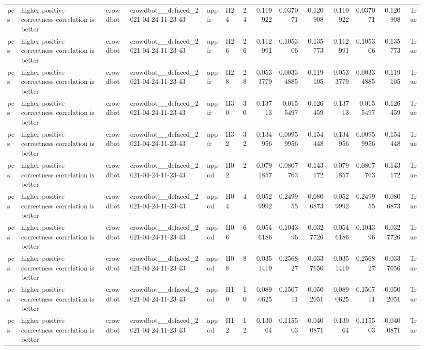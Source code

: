 \begin{longtable}{llllllrrrrrrrr}
pcs & higher positive correctness correlation is better & crowdbot & crowdbot\_\_defaced\_2021-04-24-11-23-43 & appfr & H24 & 24 & 0.119922 & 0.037071 & -0.120908 & 0.119922 & 0.037071 & -0.120908 & True \\
pcs & higher positive correctness correlation is better & crowdbot & crowdbot\_\_defaced\_2021-04-24-11-23-43 & appfr & H26 & 26 & 0.112991 & 0.105306 & -0.135773 & 0.112991 & 0.105306 & -0.135773 & True \\
pcs & higher positive correctness correlation is better & crowdbot & crowdbot\_\_defaced\_2021-04-24-11-23-43 & appfr & H28 & 28 & 0.0533779 & 0.00334885 & -0.119105 & 0.0533779 & 0.00334885 & -0.119105 & True \\
pcs & higher positive correctness correlation is better & crowdbot & crowdbot\_\_defaced\_2021-04-24-11-23-43 & appfr & H30 & 30 & -0.13713 & -0.0155497 & -0.126459 & -0.13713 & -0.0155497 & -0.126459 & True \\
pcs & higher positive correctness correlation is better & crowdbot & crowdbot\_\_defaced\_2021-04-24-11-23-43 & appfr & H32 & 32 & -0.134956 & 0.00959956 & -0.154448 & -0.134956 & 0.00959956 & -0.154448 & True \\
pcs & higher positive correctness correlation is better & crowdbot & crowdbot\_\_defaced\_2021-04-24-11-23-43 & appod & H02 & 2 & -0.0791857 & 0.0807763 & -0.143172 & -0.0791857 & 0.0807763 & -0.143172 & True \\
pcs & higher positive correctness correlation is better & crowdbot & crowdbot\_\_defaced\_2021-04-24-11-23-43 & appod & H04 & 4 & -0.0529992 & 0.249955 & -0.0806873 & -0.0529992 & 0.249955 & -0.0806873 & True \\
pcs & higher positive correctness correlation is better & crowdbot & crowdbot\_\_defaced\_2021-04-24-11-23-43 & appod & H06 & 6 & 0.0546186 & 0.104396 & -0.0327726 & 0.0546186 & 0.104396 & -0.0327726 & True \\
pcs & higher positive correctness correlation is better & crowdbot & crowdbot\_\_defaced\_2021-04-24-11-23-43 & appod & H08 & 8 & 0.0351419 & 0.256827 & -0.0337656 & 0.0351419 & 0.256827 & -0.0337656 & True \\
pcs & higher positive correctness correlation is better & crowdbot & crowdbot\_\_defaced\_2021-04-24-11-23-43 & appod & H10 & 10 & 0.0890625 & 0.150711 & -0.0502051 & 0.0890625 & 0.150711 & -0.0502051 & True \\
pcs & higher positive correctness correlation is better & crowdbot & crowdbot\_\_defaced\_2021-04-24-11-23-43 & appod & H12 & 12 & 0.13064 & 0.115503 & -0.0400871 & 0.13064 & 0.115503 & -0.0400871 & True \\

\end{longtable}
